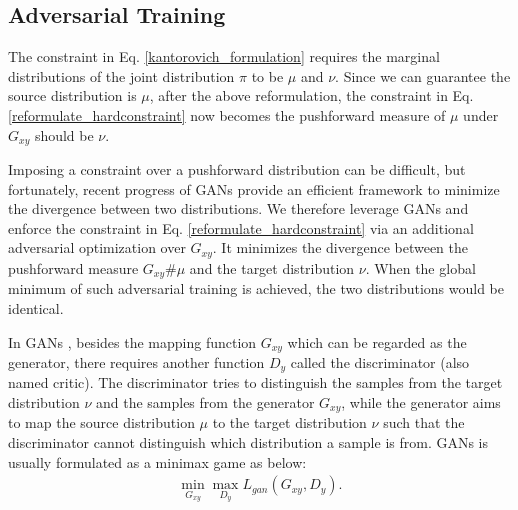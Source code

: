 \documentclass[runningheads]{llncs}
\begin{document}
\subsection{Adversarial Training}

The constraint in Eq. \eqref{kantorovich_formulation} requires the marginal distributions of the joint distribution $\pi$ to be $\mu$ and $\nu$. Since we can guarantee the source distribution is $\mu$, after the above reformulation, the constraint in Eq. \eqref{reformulate_hardconstraint} now becomes the pushforward measure of $\mu$ under $G_{xy}$ should be $\nu$. 

Imposing a constraint over a pushforward distribution can be difficult, but fortunately, recent progress of GANs \cite{gan} provide an efficient framework to minimize the divergence between two distributions. We therefore leverage GANs and enforce the constraint in Eq. \eqref{reformulate_hardconstraint} via an additional adversarial optimization over $G_{xy}$. It minimizes the divergence between the pushforward measure $G_{xy}\#\mu$ and the target distribution $\nu$. When the global minimum of such adversarial training is achieved, the two distributions would be identical. 

In GANs \cite{gan}, besides the mapping function $G_{xy}$ which can be regarded as the generator, there requires another function $D_{y}$ called the discriminator (also named critic). The discriminator tries to distinguish the samples from the target distribution $\nu$ and the samples from the generator $G_{xy}$, while the generator aims to map the source distribution $\mu$ to the target distribution $\nu$ such that the discriminator cannot distinguish which distribution a sample is from. GANs is usually formulated as a minimax game as below:
\begin{equation}
\begin{aligned}
\min\limits_{G_{xy}} \max\limits_{D_{y}} L_{gan} (G_{xy},D_{y}). 
\end{aligned}
\end{equation} 
\end{document}
